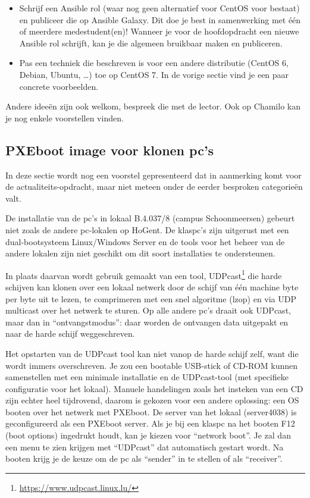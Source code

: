 \begin{itemize}
\item Schrijf een Ansible rol (waar nog geen alternatief voor CentOS voor bestaat) en publiceer die op Ansible Galaxy. Dit doe je best in samenwerking met één of meerdere medestudent(en)! Wanneer je voor de hoofdopdracht een nieuwe Ansible rol schrijft, kan je die algemeen bruikbaar maken en publiceren.
\item Pas een techniek die beschreven is voor een andere distributie (CentOS 6, Debian, Ubuntu, \ldots{}) toe op CentOS 7. In de vorige sectie vind je een paar concrete voorbeelden.
\end{itemize}

Andere ideeën zijn ook welkom, bespreek die met de lector. Ook op Chamilo kan je nog enkele voorstellen vinden.

\subsection{PXEboot image voor klonen pc's}
\label{sub:pxeboot_image_voor_klonen_pc_s}

In deze sectie wordt nog een voorstel gepresenteerd dat in aanmerking komt voor de actualiteits-opdracht, maar niet meteen onder de eerder besproken categorieën valt.

De installatie van de pc's in lokaal B.4.037/8 (campus Schoonmeersen) gebeurt niet zoals de andere pc-lokalen op HoGent. De klaspc's zijn uitgerust met een dual-bootsysteem Linux/Windows Server en de tools voor het beheer van de andere lokalen zijn niet geschikt om dit soort installaties te ondersteunen.

In plaats daarvan wordt gebruik gemaakt van een tool, UDPcast\footnote{\url{https://www.udpcast.linux.lu/}} die harde schijven kan klonen over een lokaal netwerk door de schijf van één machine byte per byte uit te lezen, te comprimeren met een snel algoritme (lzop) en via UDP multicast over het netwerk te sturen. Op alle andere pc's draait ook UDPcast, maar dan in ``ontvangstmodus'': daar worden de ontvangen data uitgepakt en naar de harde schijf weggeschreven.

Het opstarten van de UDPcast tool kan niet vanop de harde schijf zelf, want die wordt immers overschreven. Je zou een bootable USB-stick of CD-ROM kunnen samenstellen met een minimale installatie en de UDPcast-tool (met specifieke configuratie voor het lokaal). Manuele handelingen zoals het insteken van een CD zijn echter heel tijdrovend, daarom is gekozen voor een andere oplossing: een OS booten over het netwerk met PXEboot. De server van het lokaal (server4038) is geconfigureerd als een PXEboot server. Als je bij een klaspc na het booten F12 (boot options) ingedrukt houdt, kan je kiezen voor ``network boot''. Je zal dan een menu te zien krijgen met ``UDPcast'' dat automatisch gestart wordt. Na booten krijg je de keuze om de pc als ``sender'' in te stellen of als ``receiver''.

